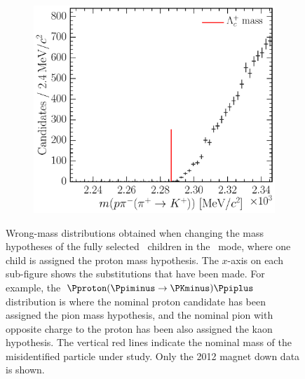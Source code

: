 \begin{figure}
\begin{subfigure}[b]{0.3\textwidth}
    \caption{\decay{\PLambdac}{\Pproton\PKminus\PKplus}}
    \label{fig:cpv:selection:background_study:ppipi_baryon:pkk}
  \end{subfigure}
  \begin{subfigure}[b]{0.3\textwidth}
    \includegraphics[width=\textwidth]{figures/cpv/selection/background_study/ppipi/LcToppipi_2012_MagDown_Lc_pp_pim_pipTokp}
    \caption{\decay{\PLambdac}{\Pproton\Ppiminus\PKplus}}
    \label{fig:cpv:selection:background_study:ppipi_baryon:ppik}
  \end{subfigure}
  \caption{%
    Wrong-mass distributions obtained when changing the mass hypotheses of the
    fully selected \PLambdac\ children in the \ppipi\ mode, where one child is
    assigned the proton mass hypothesis.
    The $x$-axis on each sub-figure shows the substitutions that have been
    made.
    For example, the ${\Pproton(\Ppiminus \to \PKminus)\Ppiplus}$ distribution is where the
    nominal proton candidate has been assigned the pion mass hypothesis, and
    the nominal pion with opposite charge to the proton has been also assigned
    the kaon hypothesis.
    The vertical red lines indicate the nominal mass of the misidentified 
    particle under study.
    Only the 2012 magnet down data is shown.
  }
  \label{fig:cpv:selection:background_study:ppipi_baryon}
\end{figure}


